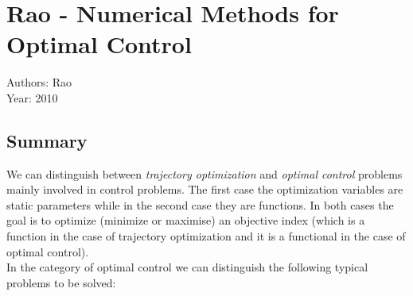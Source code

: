 \section{Rao - Numerical Methods for Optimal Control \cite{Rao} \cite{Betts}}
Authors: Rao\\
Year: 2010
\subsection*{Summary}
We can distinguish between 	\textit{trajectory optimization} and \textit{optimal control} problems mainly involved in control problems. The first case the optimization variables are static parameters while in the second case they are functions. In both cases the goal is to optimize (minimize or maximise) an objective index (which is a function in the case of trajectory optimization and it is a functional in the case of optimal control).\\
In the category of optimal control we can distinguish the following typical problems to be solved:
